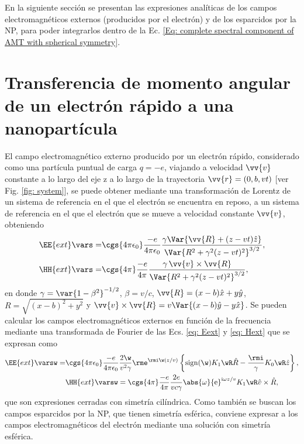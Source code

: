 En la siguiente sección se presentan las expresiones analíticas de los campos electromagnéticos externos (producidos por el electrón) y de los esparcidos por la NP, para poder integrarlos dentro de la Ec. \eqref{Eq: complete spectral component of AMT with spherical symmetry}.
%
%
\section{Transferencia de momento angular de un electrón rápido a una nanopartícula}
El campo electromagnético externo producido por un electrón rápido, considerado como una partícula puntual de carga $q=-e$, viajando a velocidad $\vv{v}$ constante a lo largo del eje z a lo largo de la trayectoria $\vv{r}=(0,b,vt)$ [ver Fig. \ref{fig: system}], se puede obtener mediante una transformación de Lorentz de un sistema de referencia en el que el electrón se encuentra en reposo, a un sistema de referencia en el que el electrón que se mueve a velocidad constante $\vv{v}$, obteniendo \cite{jackson}
\begin{align}
\EE{ext}\vars =& \cgs{4\pi\epsilon_0}\frac{-e}{4\pi\epsilon_0}\frac{\gamma \Var{\vv{R}+(z-vt)\hat{z}}}{\Var{R^2+\gamma^2(z-vt)^2}^{3/2}}, \label{eq: Eext}\\
\HH{ext}\vars =& \cgs{4\pi}\frac{-e}{4\pi}\frac{\gamma \, \vv{v}\times\vv{R}}{\Var{R^2+\gamma^2(z-vt)^2}^{3/2}}, \label{eq: Hext}
\end{align}
en donde $\gamma = \var{1-\beta^2}^{-1/2}$, $\beta = v/c$, $\vv{R}=(x-b)\hat{x}+y\hat{y}$, $R = \sqrt{(x-b)^2+y^2}$ y $\vv{v}\times\vv{R}=v\Var{(x-b)\hat{y}-y\hat{x}}$. Se pueden calcular los campos electromagnéticos externos en función de la frecuencia mediante una transformada de Fourier de las Ecs. \eqref{eq: Eext} y \eqref{eq: Hext} que se expresan como \cite{maciel2019electromagnetic}
\begin{align}
\EE{ext}\varsw = &\cgs{4\pi\epsilon_0}\frac{-e}{4\pi\epsilon_0}  \frac{2\w}{v^2 \gamma} \rme^{\rmi \w (z/v)} \left\{ {\rm sign}(\w) K_1\wR\hat{R} - \frac{\rmi}{\gamma}K_0\wR \hat{z}\right\},\\
&\HH{ext}\varsw = \cgs{4\pi}\frac{-e}{4\pi}\frac{2e}{v c \gamma} \abs{\omega} {\rm e}^{{\rm i}\omega z /v} K_1\wR \hat{v}\times\hat{R},
\end{align}
que son expresiones cerradas con simetría cilíndrica. Como también se buscan los campos esparcidos por la NP, que tienen simetría esférica, conviene expresar a los campos electromagnéticos del electrón mediante una solución con simetría esférica. 

